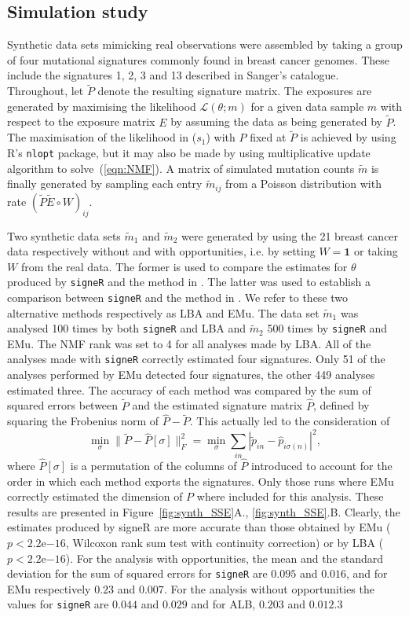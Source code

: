 \documentclass{bioinfo}
\begin{document}
\subsection{Simulation study}
Synthetic data sets mimicking real observations were assembled by
taking a group of four mutational signatures commonly found in breast
cancer genomes. These include the signatures 1, 2, 3 and 13 described
in Sanger's catalogue. Throughout, let $\widetilde P$ denote the
resulting signature matrix.  The exposures are generated by maximising
the likelihood $\mathcal L(\theta; m)$ for a given data sample $m$
with respect to the exposure matrix $E$ by assuming the data as being
generated by $\widetilde P$. The maximisation of the likelihood in
($s_1$) with $P$ fixed at $\widetilde P$ is achieved by using R's 
\texttt{nlopt} package, but it may also be made by using
\cite{LS} multiplicative update algorithm to solve~(\ref{eqn:NMF}). A
matrix of simulated mutation counts $\widetilde m$ is finally
generated by sampling each entry $\widetilde m_{ij}$ from a Poisson
distribution with rate $(\widetilde P\widetilde E\circ W)_{ij}$.

Two synthetic data sets $\widetilde m_1$ and $\widetilde m_2$ were
generated by using the 21 breast cancer data respectively without and
with opportunities, i.e. by setting $W=\mathbf{1}$  or taking $W$
from the real data. The former is used to compare the estimates for 
 $\theta$ produced by
\texttt{signeR} and the method in \cite{A}. The latter was used to
establish a comparison between \texttt{signeR} and the method in
\cite{FICMV}. We refer to these two alternative methods respectively 
as LBA and EMu. The data set $\widetilde m_1$ was analysed 100 times
by both \texttt{signeR} and LBA and $\widetilde m_2$ 500 times by
\texttt{signeR} and EMu. The NMF rank was set to 4 for all analyses
made by LBA. All of the analyses made with \texttt{signeR}
correctly estimated four signatures. Only 51 of the analyses
performed by EMu detected four signatures, the other 449 analyses
estimated three.  The accuracy of each method was compared by the sum
of squared errors between $\widetilde P$ and the estimated signature
matrix $\widehat P$, defined by squaring the Frobenius norm of
$\widehat P - \widetilde P$. This actually led to the consideration of
\[
   \min_\sigma
   \big\|\widetilde P - \widehat P[\sigma]\big\|_F^2 
  = 
   \min_\sigma \sum_{in}
     |\widetilde p_{in} - \widehat p_{i \sigma(n)}|^2,
\]
where $\widehat P[\sigma]$ is a permutation of the columns of
$\widehat P$ introduced to account for the order in which each method
exports the signatures. Only those runs where EMu correctly estimated
the dimension of $P$ where included for this analysis. These results
are presented in Figure~\ref{fig:synth_SSE}A., \ref{fig:synth_SSE}.B.
Clearly, the estimates produced by signeR are more accurate than those
obtained by EMu ($p < 2.2$e$-16$, Wilcoxon rank sum test with
continuity correction) or by LBA ($p < 2.2$e$-16$). For the analysis
with opportunities, the mean and the standard deviation for the sum of
squared errors for \texttt{signeR} are $0.095$ and $0.016$, and for
EMu respectively $0.23$ and $0.007$. For the analysis without
opportunities the values for \texttt{signeR} are $0.044$ and $0.029$
and for ALB, $0.203$ and $0.012$.3
\end{document}
